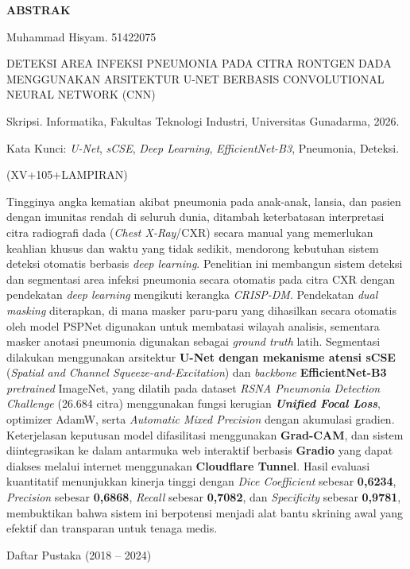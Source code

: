 \documentclass[12pt,a4paper,oneside]{book}
\newcommand{\addfrontmattertoc}[1]{%
  \addtocontents{toc}{\protect\contentsline{chapter}{\textnormal{#1}}{\textnormal{\thepage}}{}}%
}
\newenvironment{skripsiabstract}[1]
  {\begin{center}
    \bfseries\fontsize{14pt}{14pt}\selectfont\MakeUppercase{#1}
   \end{center}
   \vspace{2\baselineskip}
   \singlespacing
   \fontsize{12pt}{12pt}\selectfont}
  {\par\vspace{\baselineskip}}
\begin{document}
\begin{skripsiabstract}{Abstrak}
\addfrontmattertoc{ABSTRAK}

\noindent Muhammad Hisyam. 51422075

\vspace{\baselineskip}

\noindent DETEKSI AREA INFEKSI PNEUMONIA PADA CITRA RONTGEN DADA MENGGUNAKAN ARSITEKTUR U-NET BERBASIS CONVOLUTIONAL NEURAL NETWORK (CNN)

\vspace{\baselineskip}

\noindent Skripsi. Informatika, Fakultas Teknologi Industri, Universitas Gunadarma, 2026.

\vspace{\baselineskip}

\noindent Kata Kunci: \textit{U-Net}, \textit{sCSE}, \textit{Deep Learning}, \textit{EfficientNet-B3}, Pneumonia, Deteksi.

\vspace{\baselineskip}

\noindent (XV+105+LAMPIRAN)

\vspace{\baselineskip}

\noindent Tingginya angka kematian akibat pneumonia pada anak-anak, lansia, dan pasien dengan imunitas rendah di seluruh dunia, ditambah keterbatasan interpretasi citra radiografi dada (\textit{Chest X-Ray}/CXR) secara manual yang memerlukan keahlian khusus dan waktu yang tidak sedikit, mendorong kebutuhan sistem deteksi otomatis berbasis \textit{deep learning}. Penelitian ini membangun sistem deteksi dan segmentasi area infeksi pneumonia secara otomatis pada citra CXR dengan pendekatan \textit{deep learning} mengikuti kerangka \textit{CRISP-DM}. Pendekatan \textit{dual masking} diterapkan, di mana masker paru-paru yang dihasilkan secara otomatis oleh model PSPNet digunakan untuk membatasi wilayah analisis, sementara masker anotasi pneumonia digunakan sebagai \textit{ground truth} latih. Segmentasi dilakukan menggunakan arsitektur \textbf{U-Net dengan mekanisme atensi sCSE} (\textit{Spatial and Channel Squeeze-and-Excitation}) dan \textit{backbone} \textbf{EfficientNet-B3} \textit{pretrained} ImageNet, yang dilatih pada dataset \textit{RSNA Pneumonia Detection Challenge} (26.684 citra) menggunakan fungsi kerugian \textbf{\textit{Unified Focal Loss}}, optimizer AdamW, serta \textit{Automatic Mixed Precision} dengan akumulasi gradien. Keterjelasan keputusan model difasilitasi menggunakan \textbf{Grad-CAM}, dan sistem diintegrasikan ke dalam antarmuka web interaktif berbasis \textbf{Gradio} yang dapat diakses melalui internet menggunakan \textbf{Cloudflare Tunnel}. Hasil evaluasi kuantitatif menunjukkan kinerja tinggi dengan \textit{Dice Coefficient} sebesar \textbf{0,6234}, \textit{Precision} sebesar \textbf{0,6868}, \textit{Recall} sebesar \textbf{0,7082}, dan \textit{Specificity} sebesar \textbf{0,9781}, membuktikan bahwa sistem ini berpotensi menjadi alat bantu skrining awal yang efektif dan transparan untuk tenaga medis.

\noindent Daftar Pustaka (2018 -- 2024)

\end{skripsiabstract}
\end{document}
